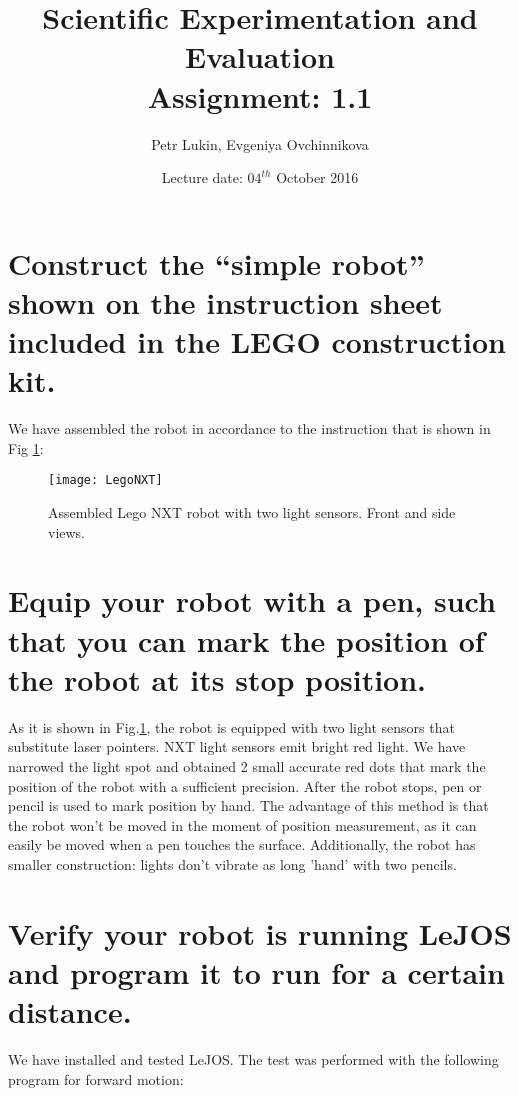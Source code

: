 \documentclass[a4paper, 12pt]{article}
\title{Scientific Experimentation and Evaluation  \\
				Assignment: 1.1}
\author{Petr Lukin, Evgeniya Ovchinnikova}
\date{Lecture date: $04^{th}$ October 2016}
\begin{document}
\maketitle

\section{Construct the “simple robot” shown on the instruction sheet included in the LEGO construction
kit.}

We have assembled the robot in accordance to the instruction that is shown in Fig \ref{fig:robot}:
\begin{figure}[h]
  \centering
  \caption{Assembled Lego NXT robot with two light sensors. Front and side views.\label{fig:robot}}
  \texttt{[image: LegoNXT]}
\end{figure}

\section{Equip your robot with a pen, such that you can mark the position of the robot at its stop
position.}
As it is shown in Fig.\ref{fig:robot}, the robot is equipped with two light sensors that substitute laser pointers. NXT light sensors emit bright red light. We have narrowed the light spot and obtained 2 small accurate red dots that mark the position of the robot with a sufficient precision. After the robot stops, pen or pencil is used to mark position by hand. The advantage of this method is that the robot won't be moved in the moment of position measurement, as it can easily be moved when a pen touches the surface. Additionally, the robot has smaller construction: lights don't vibrate as long 'hand' with two pencils. 

\section{Verify your robot is running LeJOS and program it to run for a certain
distance.}
We have installed and tested LeJOS. The test was performed with the following program for forward motion:
\end{document}
